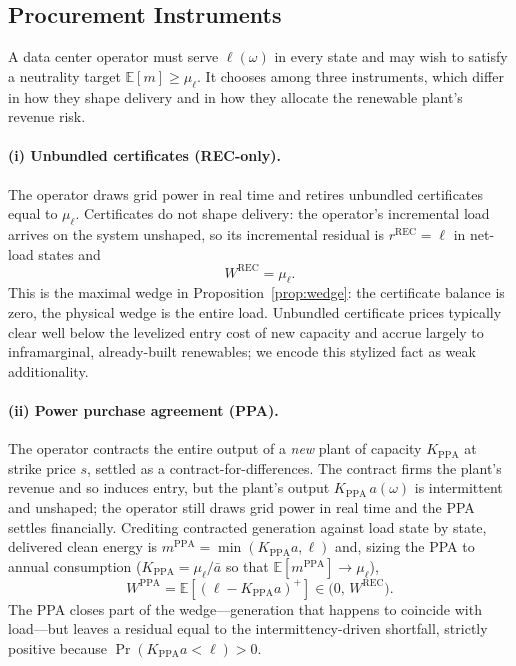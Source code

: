 \documentclass[a4paper,fleqn,longmktitle]{cas-sc}
\theoremstyle{plain}
\theoremstyle{definition}
\newcommand{\E}{\mathbb{E}}
\newcommand{\pos}[1]{\left(#1\right)^{+}}
\newcommand{\REC}{\mathrm{REC}}
\newcommand{\PPA}{\mathrm{PPA}}
\begin{document}
\subsection{Procurement Instruments}\label{subsec:instruments}

A data center operator must serve $\ell(\omega)$ in every state and may wish to satisfy a neutrality target $\E[m]\ge\mu_\ell$. It chooses among three instruments, which differ in how they shape delivery and in how they allocate the renewable plant's revenue risk.

\paragraph{(i) Unbundled certificates (REC-only).} The operator draws grid power in real time and retires unbundled certificates equal to $\mu_\ell$. Certificates do not shape delivery: the operator's incremental load arrives on the system unshaped, so its incremental residual is $r^{\REC}=\ell$ in net-load states and
\begin{equation}
    W^{\REC}=\mu_\ell.
\end{equation}
This is the maximal wedge in Proposition~\ref{prop:wedge}: the certificate balance is zero, the physical wedge is the entire load. Unbundled certificate prices typically clear well below the levelized entry cost of new capacity and accrue largely to inframarginal, already-built renewables; we encode this stylized fact as weak additionality.

\paragraph{(ii) Power purchase agreement (PPA).} The operator contracts the entire output of a \emph{new} plant of capacity $K_{\PPA}$ at strike price $s$, settled as a contract-for-differences. The contract firms the plant's revenue and so induces entry, but the plant's output $K_{\PPA}\,a(\omega)$ is intermittent and unshaped; the operator still draws grid power in real time and the PPA settles financially. Crediting contracted generation against load state by state, delivered clean energy is $m^{\PPA}=\min(K_{\PPA}a,\ell)$ and, sizing the PPA to annual consumption ($K_{\PPA}=\mu_\ell/\bar a$ so that $\E[m^{\PPA}]\to\mu_\ell$),
\begin{equation}
    W^{\PPA}=\E\!\left[\pos{\ell-K_{\PPA}a}\right]\in\big(0,\,W^{\REC}\big).
\end{equation}
The PPA closes part of the wedge---generation that happens to coincide with load---but leaves a residual equal to the intermittency-driven shortfall, strictly positive because $\Pr(K_{\PPA}a<\ell)>0$.
\end{document}
